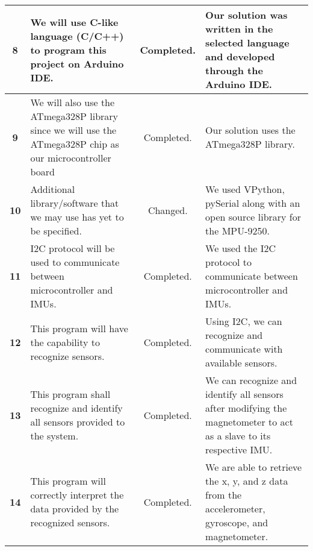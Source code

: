 \begin{center}
\begin{tabular}{|c|p{5cm}|c|p{5cm}|}
\textbf{8}
& We will use C-like language (C/C++) to program this project on Arduino IDE.
& Completed.
& Our solution was written in the selected language and developed through the Arduino IDE.
\\ \hline
 
\textbf{9}
& We will also use the ATmega328P library since we will use the ATmega328P chip as our microcontroller board
& Completed.
& Our solution uses the ATmega328P library.
\\ \hline
 
\textbf{10}
& Additional library/software that we may use has yet to be specified.
& Changed.
& We used VPython, pySerial along with an open source library for the MPU-9250.
\\ \hline
 
\textbf{11}
& I2C protocol will be used to communicate between microcontroller and IMUs.
& Completed.
& We used the I2C protocol to communicate between microcontroller and IMUs.
\\ \hline
 
\textbf{12}
& This program will have the capability to recognize sensors.
& Completed.
& Using I2C, we can recognize and communicate with available sensors.
\\ \hline
 
\textbf{13}
& This program shall recognize and identify all sensors provided to the system.
& Completed.
& We can recognize and identify all sensors after modifying the magnetometer to act as a slave to its respective IMU.
\\ \hline
 
\textbf{14}
& This program will correctly interpret the data provided by the recognized sensors.
& Completed.
& We are able to retrieve the x, y, and z data from the accelerometer, gyroscope, and magnetometer.
\\ \hline
 
\end{tabular}
\end{center}
 
\hfill \break


